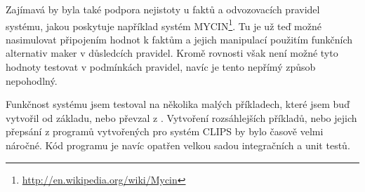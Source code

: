 Zajímavá by byla také podpora nejistoty u faktů a odvozovacích pravidel
systému, jakou poskytuje například systém
MYCIN\footnote{\url{http://en.wikipedia.org/wiki/Mycin}}. Tu je už teď možné
nasimulovat připojením hodnot k faktům a jejich manipulací použitím funkčních
alternativ maker v důsledcích pravidel. Kromě rovnosti však není možné tyto
hodnoty testovat v podmínkách pravidel, navíc je tento nepřímý způsob
nepohodlný.

Funkčnost systému jsem testoval na několika malých příkladech, které jsem buď
vytvořil od základu, nebo převzal z \cite{paradigms}. Vytvoření rozsáhlejších
příkladů, nebo jejich přepsání z programů vytvořených pro systém CLIPS by bylo
časově velmi náročné. Kód programu je navíc opatřen velkou sadou integračních a
unit testů.
